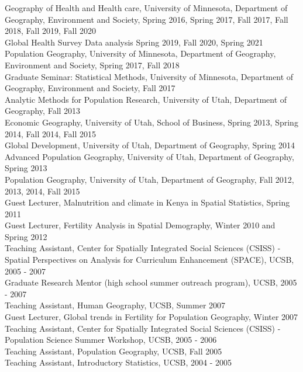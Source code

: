 \documentclass[11pt]{article} %
\begin{document}
\noindent
Geography of Health and Health care, University of Minnesota, Department of Geography, Environment and Society, Spring 2016, Spring 2017, Fall 2017, Fall 2018, Fall 2019, Fall 2020\\
Global Health Survey Data analysis Spring 2019, Fall 2020, Spring 2021\\
Population Geography, University of Minnesota, Department of Geography, Environment and Society, Spring 2017, Fall 2018\\
Graduate Seminar: Statistical Methods, University of Minnesota, Department of Geography, Environment and Society, Fall 2017\\
Analytic Methods for Population Research, University of Utah, Department of Geography, Fall 2013\\
Economic Geography, University of Utah, School of Business, Spring 2013, Spring 2014, Fall 2014, Fall 2015\\
Global Development, University of Utah, Department of Geography, Spring 2014\\
Advanced Population Geography, University of Utah, Department of Geography, Spring 2013\\
Population Geography, University of Utah, Department of Geography, Fall 2012, 2013, 2014, Fall 2015\\
Guest Lecturer, Malnutrition and climate in Kenya in Spatial Statistics, Spring 2011\\
Guest Lecturer, Fertility Analysis in Spatial Demography, Winter 2010 and Spring 2012 \\
Teaching Assistant, Center for Spatially Integrated Social Sciences (CSISS) -  Spatial Perspectives on Analysis for Curriculum Enhancement (SPACE), UCSB, 2005 - 2007\\
Graduate Research Mentor (high school summer outreach program), UCSB, 2005 - 2007\\
Teaching Assistant, Human Geography, UCSB, Summer 2007\\
Guest Lecturer, Global trends in Fertility for Population Geography, Winter 2007\\
Teaching Assistant, Center for Spatially Integrated Social Sciences (CSISS) -  Population Science Summer Workshop, UCSB, 2005 - 2006\\
Teaching Assistant, Population Geography, UCSB, Fall 2005\\
Teaching Assistant, Introductory Statistics, UCSB, 2004 - 2005\\
\end{document}
